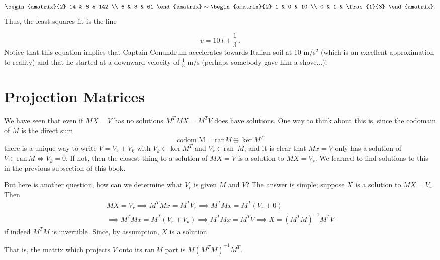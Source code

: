 \begin{example}
\[
\begin{amatrix}{2}
14 & 6 & 142 \\
6 & 3 & 61
\end{amatrix}
\sim
\begin{amatrix}{2}
1 & 0 & 10 \\
0 & 1 & \frac{1}{3}
\end{amatrix}.
\]
Thus, the least-squares fit is the line

\[
v = 10\ t + \frac{1}{3}\, .
\]
Notice that this equation implies that Captain Conundrum accelerates towards Italian soil at 10 m/s$^2$ (which is an excellent
approximation to reality) and that he started at a downward velocity of $\frac13$ m/s (perhaps somebody gave him a shove...)!

\end{example}

\section{Projection Matrices}
We have seen that even if $MX=V$ has no solutions $M^TMX=M^T V$ does have solutions. One way to think about this is, since the codomain of $M$ is the direct sum 
\[ \text{codom M}=\text{ran} M \oplus \ker M^T\] 
there is a unique way to write  $V=V_r+V_k$ with $V_k\in \ker M^T$ and $V_r\in \text{ran }\, M$, and it is clear that $Mx=V$ only has a solution of 
$V\in \text{ran}\, M \Leftrightarrow V_k=0$. If not, then the closest thing to a solution of $MX=V$ is a solution to $MX=V_r$. We learned to find solutions to this in the previous subsection of this book. 

But here is another question, how can we determine what $V_r$ is given $M$ and $V$? The answer is simple; suppose $X$ is a solution to $MX=V_r$. Then
\begin{gather*}  MX=V_r 
\implies M^TMx=M^T V_r 
\implies M^TMx=M^T (V_r + 0) \\
\implies M^TMx=M^T (V_r+V_k)
\implies M^TMx=M^T V 
\implies X=(M^TM)^{-1} M^T V 
\end{gather*}
if indeed $M^TM$ is invertible. Since, by assumption, $X$ is a solution \\
\begin{center}
\end{center}
That is, the matrix which projects $V$ onto its $\text{ran} \, M$ part is $M(M^TM)^{-1} M^T$. 

